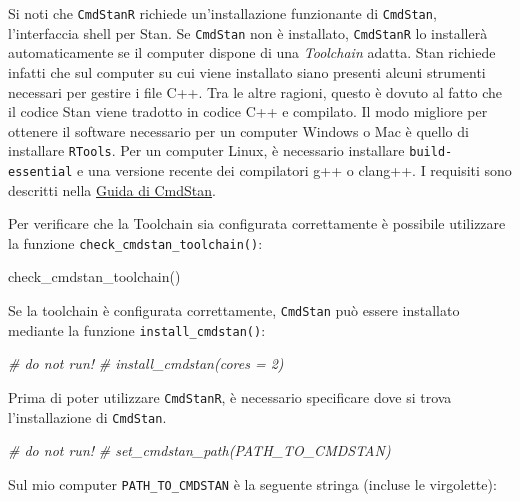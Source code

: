 \documentclass[
]{memoir}
\newenvironment{Shaded}{\begin{snugshade}}{\end{snugshade}}
\newcommand{\CommentTok}[1]{\textcolor[rgb]{0.56,0.35,0.01}{\textit{#1}}}
\newcommand{\FunctionTok}[1]{\textcolor[rgb]{0.00,0.00,0.00}{#1}}
\newcommand{\NormalTok}[1]{#1}
\begin{document}
Si noti che \texttt{CmdStanR} richiede un'installazione funzionante di \texttt{CmdStan}, l'interfaccia shell per Stan. Se \texttt{CmdStan} non è installato, \texttt{CmdStanR} lo installerà automaticamente se il computer dispone di una \emph{Toolchain} adatta. Stan richiede infatti che sul computer su cui viene installato siano presenti alcuni strumenti necessari per gestire i file C++. Tra le altre ragioni, questo è dovuto al fatto che il codice Stan viene tradotto in codice C++ e compilato. Il modo migliore per ottenere il software necessario per un computer Windows o Mac è quello di installare \texttt{RTools}. Per un computer Linux, è necessario installare \texttt{build-essential} e una versione recente dei compilatori g++ o clang++. I requisiti sono descritti nella \href{https://mc-stan.org/docs/cmdstan-guide/cmdstan-installation.html}{Guida di CmdStan}.

Per verificare che la Toolchain sia configurata correttamente è possibile utilizzare la funzione \texttt{check\_cmdstan\_toolchain()}:

\begin{Shaded}
\begin{Highlighting}[]
\FunctionTok{check\_cmdstan\_toolchain}\NormalTok{()}
\end{Highlighting}
\end{Shaded}

\noindent
Se la toolchain è configurata correttamente, \texttt{CmdStan} può essere installato mediante la funzione \texttt{install\_cmdstan()}:

\begin{Shaded}
\begin{Highlighting}[]
\CommentTok{\# do not run!}
\CommentTok{\# install\_cmdstan(cores = 2)}
\end{Highlighting}
\end{Shaded}

\noindent
Prima di poter utilizzare \texttt{CmdStanR}, è necessario specificare dove si trova l'installazione di \texttt{CmdStan}.

\begin{Shaded}
\begin{Highlighting}[]
\CommentTok{\# do not run!}
\CommentTok{\# set\_cmdstan\_path(PATH\_TO\_CMDSTAN)}
\end{Highlighting}
\end{Shaded}

\noindent
Sul mio computer \texttt{PATH\_TO\_CMDSTAN} è la seguente stringa (incluse le virgolette):
\end{document}
